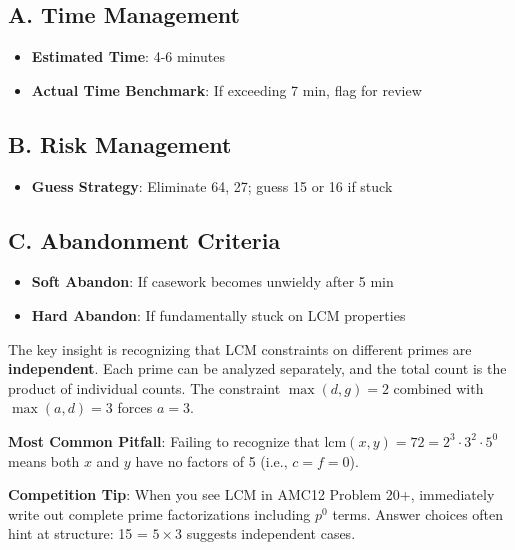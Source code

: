 \documentclass[12pt]{article}
\begin{document}
\begin{competitionbox}
\subsection*{A. Time Management}
\begin{itemize}[leftmargin=*]
    \item \textbf{Estimated Time}: 4-6 minutes
    \item \textbf{Actual Time Benchmark}: If exceeding 7 min, flag for review
\end{itemize}

\subsection*{B. Risk Management}
\begin{itemize}[leftmargin=*]
    \item \textbf{Guess Strategy}: Eliminate 64, 27; guess 15 or 16 if stuck
\end{itemize}

\subsection*{C. Abandonment Criteria}
\begin{itemize}[leftmargin=*]
    \item \textbf{Soft Abandon}: If casework becomes unwieldy after 5 min
    \item \textbf{Hard Abandon}: If fundamentally stuck on LCM properties
\end{itemize}
\end{competitionbox}

\begin{keyinsightbox}
The key insight is recognizing that LCM constraints on different primes are \textbf{independent}. Each prime can be analyzed separately, and the total count is the product of individual counts. The constraint $\max(d,g) = 2$ combined with $\max(a,d) = 3$ forces $a=3$.
\end{keyinsightbox}

\begin{warningbox}
\textbf{Most Common Pitfall}: Failing to recognize that $\text{lcm}(x,y) = 72 = 2^3 \cdot 3^2 \cdot 5^0$ means both $x$ and $y$ have no factors of 5 (i.e., $c = f = 0$).
\end{warningbox}

\begin{tipbox}
\textbf{Competition Tip}: When you see LCM in AMC12 Problem 20+, immediately write out complete prime factorizations including $p^0$ terms. Answer choices often hint at structure: 15 = $5 \times 3$ suggests independent cases.
\end{tipbox}
\end{document}
